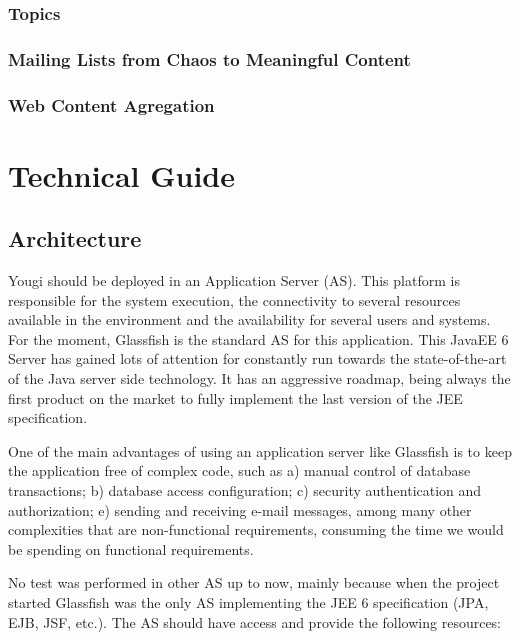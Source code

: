\documentclass[envcountsame,envcountchap]{svmono}
\begin{document}
\section{Topics}

\section{Mailing Lists from Chaos to Meaningful Content}

\section{Web Content Agregation}

\part{Technical Guide}

\chapter{Architecture}

Yougi should be deployed in an Application Server (AS). This platform is responsible for the system execution, the connectivity to several resources available in the environment and the availability for several users and systems. For the moment, Glassfish is the standard AS for this application. This JavaEE 6 Server has gained lots of attention for constantly run towards the state-of-the-art of the Java server side technology. It has an aggressive roadmap, being always the first product on the market to fully implement the last version of the JEE specification.

One of the main advantages of using an application server like Glassfish is to keep the application free of complex code, such as a) manual control of database transactions; b) database access configuration; c) security authentication and authorization; e) sending and receiving e-mail messages, among many other complexities that are non-functional requirements, consuming the time we would be spending on functional requirements.

No test was performed in other AS up to now, mainly because when the project started Glassfish was the only AS implementing the JEE 6 specification (JPA, EJB, JSF, etc.). The AS should have access and provide the following resources:
\end{document}
